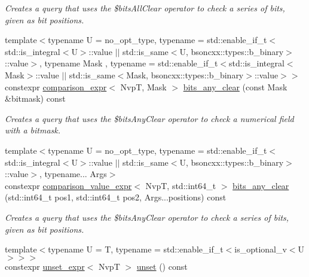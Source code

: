 \begin{DoxyCompactItemize}
\begin{DoxyCompactList}\small\item\em Creates a query that uses the \$bits\+All\+Clear operator to check a series of bits, given as bit positions. \end{DoxyCompactList}\item 
{\footnotesize template$<$typename U  = no\+\_\+opt\+\_\+type, typename  = std\+::enable\+\_\+if\+\_\+t$<$std\+::is\+\_\+integral$<$\+U$>$\+::value $\vert$$\vert$                                          std\+::is\+\_\+same$<$\+U, bsoncxx\+::types\+::b\+\_\+binary$>$\+::value$>$, typename Mask , typename  = std\+::enable\+\_\+if\+\_\+t$<$std\+::is\+\_\+integral$<$\+Mask$>$\+::value $\vert$$\vert$                                          std\+::is\+\_\+same$<$\+Mask, bsoncxx\+::types\+::b\+\_\+binary$>$\+::value$>$$>$ }\\constexpr \hyperlink{classmangrove_1_1comparison__expr}{comparison\+\_\+expr}$<$ NvpT, Mask $>$ \hyperlink{classmangrove_1_1nvp__base_ad0b8db86f08260815bfcba3ff549f86d}{bits\+\_\+any\+\_\+clear} (const Mask \&bitmask) const 
\begin{DoxyCompactList}\small\item\em Creates a query that uses the \$bits\+Any\+Clear operator to check a numerical field with a bitmask. \end{DoxyCompactList}\item 
{\footnotesize template$<$typename U  = no\+\_\+opt\+\_\+type, typename  = std\+::enable\+\_\+if\+\_\+t$<$std\+::is\+\_\+integral$<$\+U$>$\+::value $\vert$$\vert$                                          std\+::is\+\_\+same$<$\+U, bsoncxx\+::types\+::b\+\_\+binary$>$\+::value$>$, typename... Args$>$ }\\constexpr \hyperlink{classmangrove_1_1comparison__value__expr}{comparison\+\_\+value\+\_\+expr}$<$ NvpT, std\+::int64\+\_\+t $>$ \hyperlink{classmangrove_1_1nvp__base_a9af3921ef1af416730aa8965cfbfff3c}{bits\+\_\+any\+\_\+clear} (std\+::int64\+\_\+t pos1, std\+::int64\+\_\+t pos2, Args...\+positions) const 
\begin{DoxyCompactList}\small\item\em Creates a query that uses the \$bits\+Any\+Clear operator to check a series of bits, given as bit positions. \end{DoxyCompactList}\item 
{\footnotesize template$<$typename U  = T, typename  = std\+::enable\+\_\+if\+\_\+t$<$is\+\_\+optional\+\_\+v$<$\+U$>$$>$$>$ }\\constexpr \hyperlink{classmangrove_1_1unset__expr}{unset\+\_\+expr}$<$ NvpT $>$ \hyperlink{classmangrove_1_1nvp__base_a906f10008bd72b32e75f496f1a24b5d7}{unset} () const 

\end{DoxyCompactItemize}
